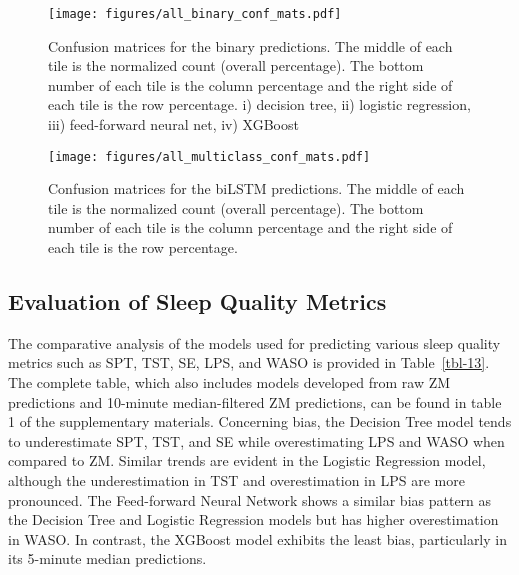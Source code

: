 \documentclass[
  10pt,
]{scrbook}
\begin{document}
\begin{figure}

{\centering \texttt{[image: figures/all\_binary\_conf\_mats.pdf]}

}

\caption{\label{fig-bin_conf_mat}Confusion matrices for the binary
predictions. The middle of each tile is the normalized count (overall
percentage). The bottom number of each tile is the column percentage and
the right side of each tile is the row percentage. i) decision tree, ii)
logistic regression, iii) feed-forward neural net, iv) XGBoost}

\end{figure}

\begin{figure}

{\centering \texttt{[image: figures/all\_multiclass\_conf\_mats.pdf]}

}

\caption{\label{fig-mul_conf_mat}Confusion matrices for the biLSTM
predictions. The middle of each tile is the normalized count (overall
percentage). The bottom number of each tile is the column percentage and
the right side of each tile is the row percentage.}

\end{figure}

\hypertarget{evaluation-of-sleep-quality-metrics}{%
\subsection{Evaluation of Sleep Quality
Metrics}\label{evaluation-of-sleep-quality-metrics}}

The comparative analysis of the models used for predicting various sleep
quality metrics such as SPT, TST, SE, LPS, and WASO is provided in
Table~\ref{tbl-13}. The complete table, which also includes models
developed from raw ZM predictions and 10-minute median-filtered ZM
predictions, can be found in table 1 of the supplementary materials.
Concerning bias, the Decision Tree model tends to underestimate SPT,
TST, and SE while overestimating LPS and WASO when compared to ZM.
Similar trends are evident in the Logistic Regression model, although
the underestimation in TST and overestimation in LPS are more
pronounced. The Feed-forward Neural Network shows a similar bias pattern
as the Decision Tree and Logistic Regression models but has higher
overestimation in WASO. In contrast, the XGBoost model exhibits the
least bias, particularly in its 5-minute median predictions.
\end{document}
